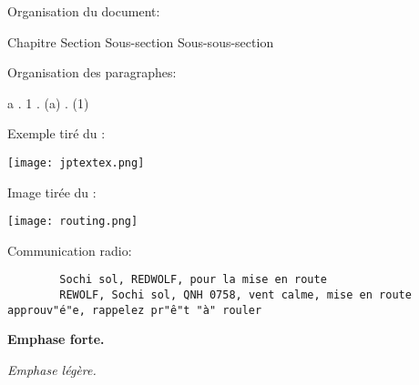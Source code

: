 \thispagestyle{default}

%

\e
    \item Organisation du document:

    {\Large Chapitre} {\large Section} Sous-section {\small Sous-sous-section}

    \item Organisation des paragraphes:

    {\Large a} . {\large 1} . (a) . {\small (1)}

    \item Exemple tiré du \jp{}:

    \texttt{[image: jptextex.png]}

    \item Image tirée du \jp{}:

    \texttt{[image: routing.png]}

    \item Communication radio:
    \begin{lstlisting}
        Sochi sol, REDWOLF, pour la mise en route
        REWOLF, Sochi sol, QNH 0758, vent calme, mise en route approuv"é"e, rappelez pr"ê"t "à" rouler
    \end{lstlisting}

    \item \textbf{Emphase forte.}

    \item \emph{Emphase légère.}

    \item {}
    
    
    \item {}

    \item {}

\ed 